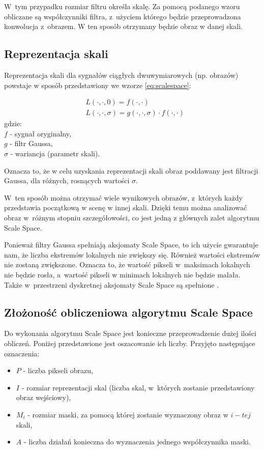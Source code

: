 W~tym przypadku rozmiar filtru określa skalę. Za pomocą podanego wzoru obliczane są współczynniki filtra, z~użyciem którego będzie przeprowadzona konwolucja z~obrazem. W ten sposób otrzymany będzie obraz w danej skali.

\subsection{Reprezentacja skali}
\label{subsec:reprezentacjaskali}
Reprezentacja skali dla sygnałów ciągłych dwuwymiarowych (np. obrazów) powstaje w sposób przedstawiony we wzorze \ref{eq:scalespace}:

\begin{equation}
\label{eq:scalespace}
\begin{split}
& L(\cdot,\cdot,0) = f(\cdot,\cdot) \\
& L(\cdot,\cdot,\sigma) = g(\cdot,\cdot,\sigma)\cdot f(\cdot,\cdot)
\end{split}
\end{equation}
gdzie:\\
$ f $ - sygnał oryginalny, \\
$ g $ - filtr Gaussa, \\
$ \sigma $ - wariancja (parametr skali).

Oznacza to, że w celu uzyskania reprezentacji skali obraz poddawany jest filtracji Gaussa, dla różnych, rosnących wartości $ \sigma $.

W~ten sposób można otrzymać wiele wynikowych obrazów, z~których każdy przedstawia początkową w scenę w innej skali. Dzięki temu można analizować obraz w~różnym stopniu szczegółowości, co jest jedną z głównych zalet algorytmu Scale Space.

Ponieważ filtry Gaussa spełniają aksjomaty Scale Space, to ich użycie gwarantuje nam, że liczba ekstremów lokalnych nie zwiększy się. Również wartości ekstremów nie zostaną zwiększone. Oznacza to, że wartość pikseli w~maksimach lokalnych nie będzie rosła, a~wartość pikseli w minimach lokalnych nie będzie malała. Także w~przestrzeni dyskretnej aksjomaty Scale Space są spełnione \cite{SSFDS}.

\subsection{Złożoność obliczeniowa algorytmu Scale Space}
\label{subsec:zlozonosc_obliczeniowa}

Do wykonania algorytmu Scale Space jest konieczne przeprowadzenie dużej ilości obliczeń. Poniżej przedstawione jest oszacowanie ich liczby. Przyjęto następujące oznaczenia:
\begin{itemize}
\item $ P $ - liczba pikseli obrazu,
\item $ I $ - rozmiar reprezentacji skal (liczba skal, w~których zostanie przedstawiony obraz wejściowy),
\item $ M_i $ - rozmiar maski, za pomocą której zostanie wyznaczony obraz w $ i-tej $ skali,
\item $ A $ - liczba działań konieczna do wyznaczenia jednego współczynnika maski.
\end{itemize}

